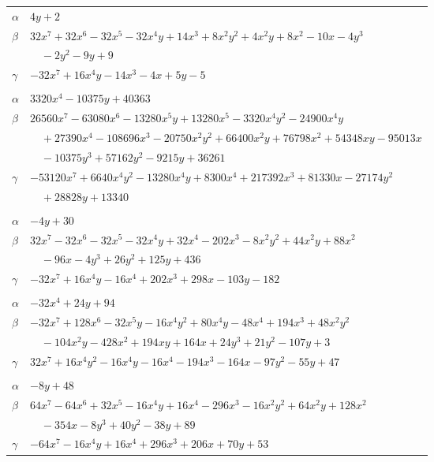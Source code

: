 \documentclass[11pt]{article}
\begin{document}
\begin{longtable}{@{}ll@{}}
$\alpha$ & $4y+2$\\
$\beta$ & $32x^{7}+32x^{6}-32x^{5}-32x^{4}y+14x^{3}+8x^{2}y^{2}+4x^{2}y+8x^{2}-10x-4y^{3}$\\
 & $\quad -2y^{2}-9y+9$\\
$\gamma$ & $-32x^{7}+16x^{4}y-14x^{3}-4x+5y-5$\\
\addlinespace[3pt]
\multicolumn{2}{@{}l}{$\{i,j\}=\{27,47\}$, $k_{ij}=2^{2}\cdot 3^{3}\cdot 7^{2}\cdot 17$}\\
$\alpha$ & $3320x^{4}-10375y+40363$\\
$\beta$ & $26560x^{7}-63080x^{6}-13280x^{5}y+13280x^{5}-3320x^{4}y^{2}-24900x^{4}y$\\
 & $\quad +27390x^{4}-108696x^{3}-20750x^{2}y^{2}+66400x^{2}y+76798x^{2}+54348xy-95013x$\\
 & $\quad -10375y^{3}+57162y^{2}-9215y+36261$\\
$\gamma$ & $-53120x^{7}+6640x^{4}y^{2}-13280x^{4}y+8300x^{4}+217392x^{3}+81330x-27174y^{2}$\\
 & $\quad +28828y+13340$\\
\addlinespace[3pt]
\multicolumn{2}{@{}l}{$\{i,j\}=\{27,63\}$, $k_{ij}=2^{3}\cdot 3^{4}$}\\
$\alpha$ & $-4y+30$\\
$\beta$ & $32x^{7}-32x^{6}-32x^{5}-32x^{4}y+32x^{4}-202x^{3}-8x^{2}y^{2}+44x^{2}y+88x^{2}$\\
 & $\quad -96x-4y^{3}+26y^{2}+125y+436$\\
$\gamma$ & $-32x^{7}+16x^{4}y-16x^{4}+202x^{3}+298x-103y-182$\\
\addlinespace[3pt]
\multicolumn{2}{@{}l}{$\{i,j\}=\{27,71\}$, $k_{ij}=2^{4}\cdot 3^{2}$}\\
$\alpha$ & $-32x^{4}+24y+94$\\
$\beta$ & $-32x^{7}+128x^{6}-32x^{5}y-16x^{4}y^{2}+80x^{4}y-48x^{4}+194x^{3}+48x^{2}y^{2}$\\
 & $\quad -104x^{2}y-428x^{2}+194xy+164x+24y^{3}+21y^{2}-107y+3$\\
$\gamma$ & $32x^{7}+16x^{4}y^{2}-16x^{4}y-16x^{4}-194x^{3}-164x-97y^{2}-55y+47$\\
\addlinespace[3pt]
\multicolumn{2}{@{}l}{$\{i,j\}=\{27,77\}$, $k_{ij}=3^{5}$}\\
$\alpha$ & $-8y+48$\\
$\beta$ & $64x^{7}-64x^{6}+32x^{5}-16x^{4}y+16x^{4}-296x^{3}-16x^{2}y^{2}+64x^{2}y+128x^{2}$\\
 & $\quad -354x-8y^{3}+40y^{2}-38y+89$\\
$\gamma$ & $-64x^{7}-16x^{4}y+16x^{4}+296x^{3}+206x+70y+53$\\

\end{longtable}
\end{document}
